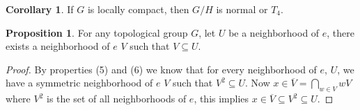 \documentclass[11pt]{article}
\theoremstyle{definition}
\newtheorem{proposition}{Proposition}[section]
\newtheorem{corollary}{Corollary}[section]
\theoremstyle{remark}
\begin{document}
\begin{corollary}\label{cor:quotient_locally_compact}
If $G$ is locally compact, then $G/H$ is normal or $T_4$.
\end{corollary}

\begin{proposition}\label{prop:nbd_subgroup}
For any topological group $G$, let $U$ be a neighborhood of $e$, there exists a neighborhood of $e$ $V$ such that $V \subseteq U$.
\end{proposition}

\begin{proof}
By properties (5) and (6) we know that for every neighborhood of $e$, $U$, we have a symmetric neighborhood of $e$ $V$ such that $V^2 \subseteq U$. Now $x \in \overline{V} = \bigcap_{w \in V} wV$ where $V^2$ is the set of all neighborhoods of $e$, this implies $x \in \overline{V} \subseteq V^2 \subseteq U$.
\end{proof}
\end{document}
